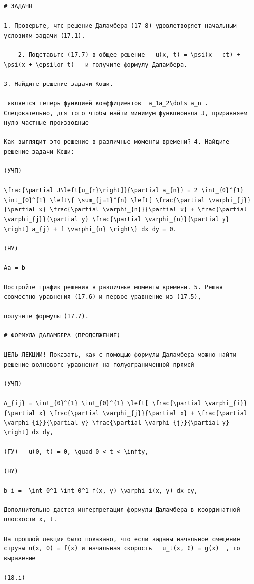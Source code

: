 \documentclass[
  ukrainian,
]{article}
\begin{document}
\begin{verbatim}
# ЗАДАЧН

1. Проверьте, что решение Даламбера (17-8) удовлетворяет начальным условиям задачи (17.1).

    2. Подставьте (17.7) в общее решение   u(x, t) = \psi(x - ct) + \psi(x + \epsilon t)   и получите формулу Даламбера.

3. Найдите решение задачи Коши:

 является теперь функцией коэффициентов  a_1a_2\dots a_n . Следовательно, для того чтобы найти минимум функционала J, приравняем нулю частные производные

Как выглядит это решение в различные моменты времени? 4. Найдите решение задачи Коши:

(УЧП)

\frac{\partial J\left[u_{n}\right]}{\partial a_{n}} = 2 \int_{0}^{1} \int_{0}^{1} \left\{ \sum_{j=1}^{n} \left[ \frac{\partial \varphi_{j}}{\partial x} \frac{\partial \varphi_{n}}{\partial x} + \frac{\partial \varphi_{j}}{\partial y} \frac{\partial \varphi_{n}}{\partial y} \right] a_{j} + f \varphi_{n} \right\} dx dy = 0.

(НУ)

Aa = b

Постройте график решения в различные моменты времени. 5. Решая совместно уравнения (17.6) и первое уравнение из (17.5),

получите формулы (17.7).

# ФОРМУЛА ДАЛАМБЕРА (ПРОДОЛЖЕНИЕ)

ЦЕЛЬ ЛЕКЦИИ! Показать, как с помощью формулы Даламбера можно найти решение волнового уравнения на полуограниченной прямой

(УЧП)

A_{ij} = \int_{0}^{1} \int_{0}^{1} \left[ \frac{\partial \varphi_{i}}{\partial x} \frac{\partial \varphi_{j}}{\partial x} + \frac{\partial \varphi_{i}}{\partial y} \frac{\partial \varphi_{j}}{\partial y} \right] dx dy,

(ГУ)   u(0, t) = 0, \quad 0 < t < \infty,

(НУ)

b_i = -\int_0^1 \int_0^1 f(x, y) \varphi_i(x, y) dx dy,

Дополнительно дается интерпретация формулы Даламбера в координатной плоскости x, t.

На прошлой лекции было показано, что если заданы начальное смещение струны u(x, 0) = f(x) и начальная скорость   u_t(x, 0) = g(x)  , то выражение

(18.i)


\end{verbatim}
\end{document}
